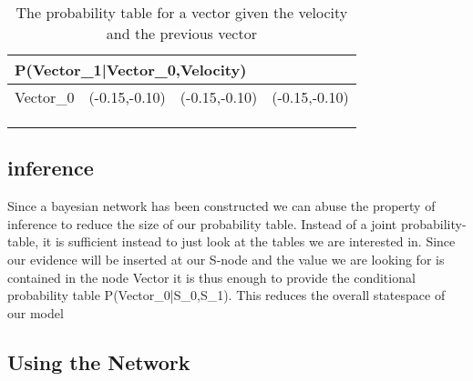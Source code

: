 \begin{center}
\begin{table}[H]
\label{Vector1_table}
\begin{tabular}{|l|l|l|l|}
\hline
\multicolumn{4}{|l|}{P(Vector\_1|Vector\_0,Velocity)} \\ \hline
Vector\_0     & (-0.15,-0.10) & (-0.15,-0.10)    & (-0.15,-0.10)  \\\hline   
[0 - 1500]      &     &     &     \\ \hline 
[1501 - 3000]    &     &     &     \\ \hline
[3001 - 4500]   &     &     &     \\ \hline
\end{tabular}
\caption{The probability table for a vector given the velocity and the previous
vector}
\end{table}
\end{center}


% 



\subsection{inference}





Since a bayesian network has been constructed we can abuse the property of
inference to reduce the size of our probability table. Instead of a joint
probability-table, it is sufficient instead to just look at the tables we are
interested in. Since our evidence will be inserted at our S-node and the
value we are looking for is contained in the node Vector it is thus enough to
provide the conditional probability table P(Vector\_0|S\_0,S\_1). This reduces
the overall statespace of our model

\subsection{Using the Network}






